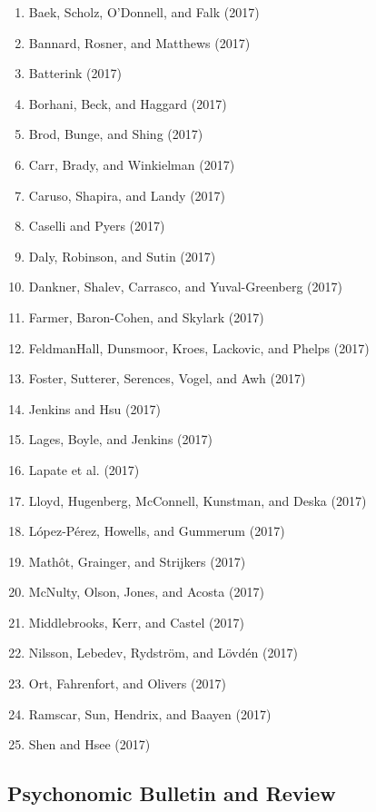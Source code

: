 \documentclass[english,man]{apa6}
\providecommand{\tightlist}{%
  \setlength{\itemsep}{0pt}\setlength{\parskip}{0pt}}
\begin{document}
\begin{enumerate}
\def\labelenumi{\arabic{enumi})}
\tightlist
\item
  Baek, Scholz, O'Donnell, and Falk (2017)
\item
  Bannard, Rosner, and Matthews (2017)
\item
  Batterink (2017)
\item
  Borhani, Beck, and Haggard (2017)
\item
  Brod, Bunge, and Shing (2017)
\item
  Carr, Brady, and Winkielman (2017)
\item
  Caruso, Shapira, and Landy (2017)
\item
  Caselli and Pyers (2017)
\item
  Daly, Robinson, and Sutin (2017)
\item
  Dankner, Shalev, Carrasco, and Yuval-Greenberg (2017)
\item
  Farmer, Baron-Cohen, and Skylark (2017)
\item
  FeldmanHall, Dunsmoor, Kroes, Lackovic, and Phelps (2017)
\item
  Foster, Sutterer, Serences, Vogel, and Awh (2017)
\item
  Jenkins and Hsu (2017)
\item
  Lages, Boyle, and Jenkins (2017)
\item
  Lapate et al. (2017)
\item
  Lloyd, Hugenberg, McConnell, Kunstman, and Deska (2017)
\item
  López-Pérez, Howells, and Gummerum (2017)
\item
  Mathôt, Grainger, and Strijkers (2017)
\item
  McNulty, Olson, Jones, and Acosta (2017)
\item
  Middlebrooks, Kerr, and Castel (2017)
\item
  Nilsson, Lebedev, Rydström, and Lövdén (2017)
\item
  Ort, Fahrenfort, and Olivers (2017)
\item
  Ramscar, Sun, Hendrix, and Baayen (2017)
\item
  Shen and Hsee (2017)
\end{enumerate}

\subsection{Psychonomic Bulletin and
Review}\label{psychonomic-bulletin-and-review}
\end{document}
